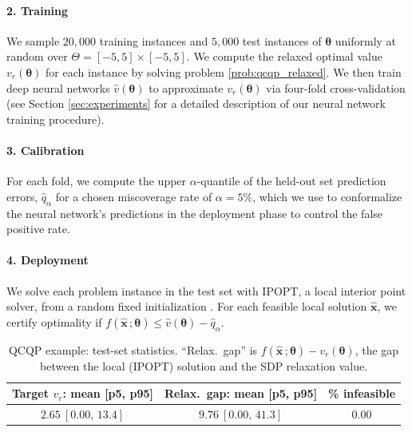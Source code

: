 \documentclass[10pt]{article} %
\theoremstyle{plain}
\theoremstyle{definition}
\theoremstyle{remark}
\begin{document}
\paragraph{2. Training} We sample $20{,}000$ training instances and $5{,}000$ test instances of $\bm{\theta}$ uniformly at random over $\Theta = [-5,5] \times [-5,5]$. We compute the relaxed optimal value $v_r(\bm{\theta})$ for each instance by solving problem \cref{prob:qcqp_relaxed}{}{}. We then train deep neural networks $\hat{v}(\bm{\theta})$ to approximate $v_r(\bm{\theta})$ via four-fold cross-validation (see Section \ref{sec:experiments} for a detailed description of our neural network training procedure).

\paragraph{3. Calibration} For each fold, we compute the upper $\alpha$-quantile of the held-out set prediction errors, $\hat{q}_\alpha$ for a chosen miscoverage rate of $\alpha = 5\%$, which we use to conformalize the neural network's predictions in the deployment phase to control the false positive rate.

\paragraph{4. Deployment} We solve each problem instance in the test set with IPOPT, a local interior point solver, from a random fixed initialization \citep{wachter2006implementation}. For each feasible local solution $\hat{\mathbf{x}}$, we certify optimality if $f(\hat{\mathbf{x}}\,;\bm{\theta}) \leq \hat{v}(\bm{\theta}) - \hat{q}_\alpha$.

\begin{table}[H]
\centering
\caption{QCQP example: test-set statistics. ``Relax.\ gap'' is $f(\hat{\mathbf{x}}\,;\bm{\theta}) - v_r(\bm{\theta})$, the gap between the local (IPOPT) solution and the SDP relaxation value.}
\begin{tabular}{ccc}
\toprule
\textbf{Target } $v_r$\textbf{: mean [p5, p95]} & \textbf{Relax.\ gap: mean [p5, p95]} & \textbf{\% infeasible} \\
\midrule
$2.65\ [0.00,\,13.4]$ & $9.76\ [0.00,\,41.3]$ & $0.00$ \\
\bottomrule
\end{tabular}
\label{tab:QCQP-data}
\end{table}
\end{document}
